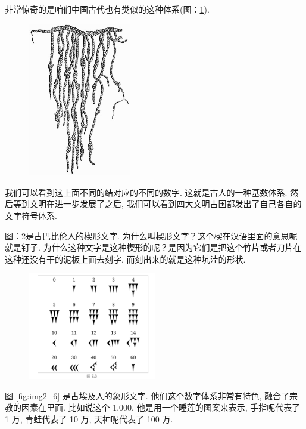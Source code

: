 非常惊奇的是咱们中国古代也有类似的这种体系(图：\ref{fig:img2_4}). 

\begin{figure}[ht]
  \centering\includegraphics[width=0.4\textwidth]{asset/840839db-800f-44f2-8f4a-b7e17b896222.png}
  \caption{}
  \label{fig:img2_4}
\end{figure}

我们可以看到这上面不同的结对应的不同的数字. 这就是古人的一种基数体系. 然后等到文明在进一步发展了之后, 我们可以看到四大文明古国都发出了自己各自的文字符号体系. 

图：\ref{fig:img2_5}是古巴比伦人的楔形文字. 为什么叫楔形文字？这个楔在汉语里面的意思呢就是钉子. 为什么这种文字是这种楔形的呢？是因为它们是把这个竹片或者刀片在这种还没有干的泥板上面去刻字, 而刻出来的就是这种坑洼的形状. 

\begin{figure}[ht]
  \centering\includegraphics[width=0.5\textwidth]{asset/df03e920-b04e-493d-aab6-b5ffb16eb0bf.png}
  \caption{}
  \label{fig:img2_5}
\end{figure}

图 \ref{fig:img2_6} 是古埃及人的象形文字. 他们这个数字体系非常有特色, 融合了宗教的因素在里面. 比如说这个 1,000, 他是用一个睡莲的图案来表示, 手指呢代表了 1 万, 青蛙代表了 10 万, 天神呢代表了 100 万. 

